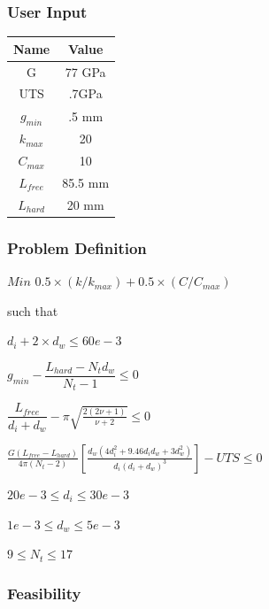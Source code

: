 \documentclass[10pt]{article}
\begin{document}
	\subsubsection{User Input}
	
\begin{center}
	 \begin{tabular}{| c  | c |  }
	 	\hline Name & Value\\
	 	\hline G & 77 GPa \\
		\hline UTS & .7GPa \\
		\hline $g_{min}$ & .5 mm\\ 
	 	\hline $k_{max}$ & 20\\
		\hline $C_{max}$ & 10\\
		\hline $L_{free}$ & 85.5 mm\\
		\hline $L_{hard}$ & 20 mm\\
		\hline
	 \end{tabular}
\end{center}

	

	\subsubsection{Problem Definition}
	
	\centerline{$Min$ \hspace{2 mm}$0.5 \times(k/k_{max}) + 0.5 \times (C/C_{max})$}
	\begin{center}such that \end{center}
	\centerline{$d_{i} + 2 \times d_{w} \leq 60e-3$}
	\centerline{$g_{min} - \dfrac{L_{hard} - N_{t}d_{w}}{N_{t}-1} \leq 0$}
	\centerline{$\dfrac{L_{free}}{d_{i} + d_{w}} - \pi \sqrt{\frac{2(2 \nu + 1)}{\nu + 2}} \leq 0$}
	\centerline{$\frac{G(L_{free} - L_{hard})}{4 \pi (N_{t} - 2) } \left[\frac{d_{w} (4d_{i}^{2} + 9.46d_{i} 
d_{w} + 3 d_{w}^{2})}{d_{i}(d_{i}+d_{w})^{3}}\right] - UTS \leq 0$}
    \centerline{$20e-3 \leq d_{i} \leq 30e-3$}
    \centerline{$1e-3 \leq d_{w} \leq 5e-3$}
    \centerline{$9 \leq N_{t} \leq 17$}
	
	\subsubsection{Feasibility}
	
\end{document}
